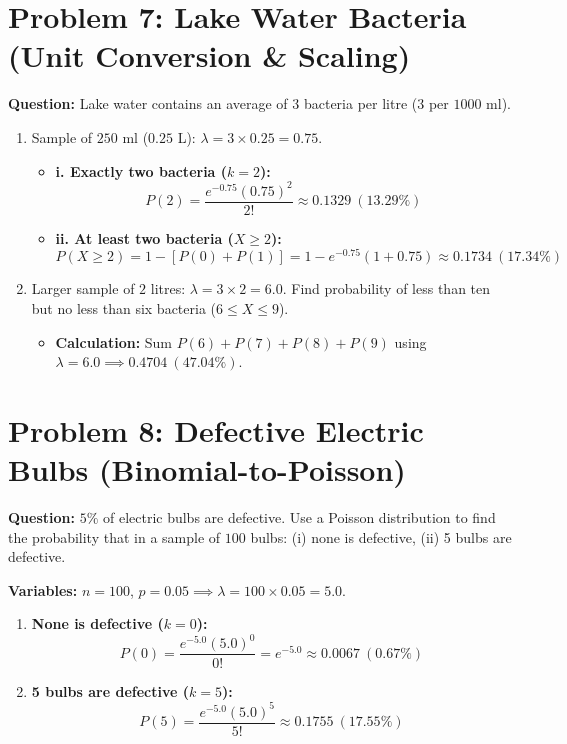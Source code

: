 \documentclass[11pt,a4paper]{article}
\begin{document}
\section*{Problem 7: Lake Water Bacteria (Unit Conversion \& Scaling)}
\textbf{Question:} Lake water contains an average of $3$ bacteria per litre ($3$ per $1000$ ml). 
\begin{enumerate}
    \item[a)] Sample of $250$ ml ($0.25$ L): $\lambda = 3 \times 0.25 = 0.75$.
    \begin{itemize}
        \item \textbf{i. Exactly two bacteria ($k=2$):} 
        $$P(2) = \frac{e^{-0.75}(0.75)^2}{2!} \approx \mathbf{0.1329} \ (13.29\%)$$
        \item \textbf{ii. At least two bacteria ($X \ge 2$):} 
        $$P(X \ge 2) = 1 - [P(0) + P(1)] = 1 - e^{-0.75}(1 + 0.75) \approx \mathbf{0.1734} \ (17.34\%)$$
    \end{itemize}
    \item[b)] Larger sample of $2$ litres: $\lambda = 3 \times 2 = 6.0$. Find probability of less than ten but no less than six bacteria ($6 \le X \le 9$).
    \begin{itemize}
        \item \textbf{Calculation:} Sum $P(6) + P(7) + P(8) + P(9)$ using $\lambda = 6.0 \implies \mathbf{0.4704} \ (47.04\%).$
    \end{itemize}
\end{enumerate}

\section*{Problem 8: Defective Electric Bulbs (Binomial-to-Poisson)}
\textbf{Question:} $5\%$ of electric bulbs are defective. Use a Poisson distribution to find the probability that in a sample of $100$ bulbs: (i) none is defective, (ii) 5 bulbs are defective.

\noindent\textbf{Variables:} $n = 100$, $p = 0.05 \implies \lambda = 100 \times 0.05 = 5.0$.
\begin{enumerate}
    \item[\textbf{(i)}] \textbf{None is defective ($k=0$):}
    $$P(0) = \frac{e^{-5.0}(5.0)^0}{0!} = e^{-5.0} \approx \mathbf{0.0067} \ (0.67\%)$$
    \item[\textbf{(ii)}] \textbf{5 bulbs are defective ($k=5$):}
    $$P(5) = \frac{e^{-5.0}(5.0)^5}{5!} \approx \mathbf{0.1755} \ (17.55\%)$$
\end{enumerate}
\end{document}

